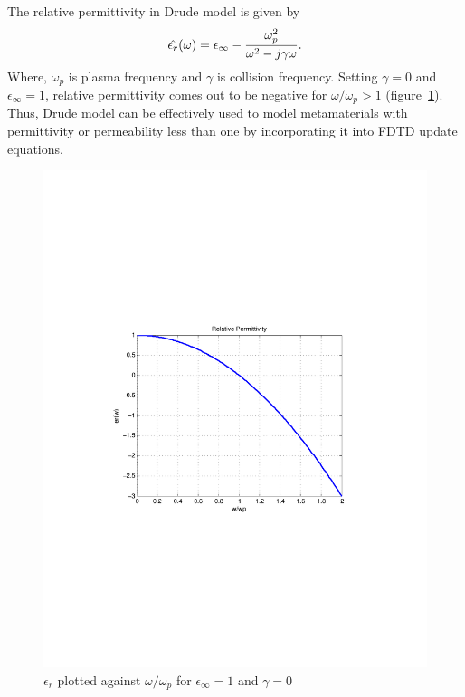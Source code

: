 \documentclass{article}
\begin{document}
The relative permittivity in Drude model is given by
\begin{equation}
\centering
\hat{\epsilon_r}(\omega)=\epsilon_\infty-\dfrac{\omega^2_p}{\omega^2-j\gamma\omega}.
\label{er-Drude}
\end{equation}
Where, $\omega_p$ is plasma frequency and $\gamma$ is collision frequency. Setting $\gamma=0$ and $\epsilon_\infty=1$, relative permittivity comes out to be negative for $\omega/\omega_p > 1$ (figure~\ref{DrudeModel_er}). Thus, Drude model can be effectively used to model metamaterials with permittivity or permeability less than one by incorporating it into FDTD update equations.
\begin{figure}[t!]
\centering
\includegraphics[scale=0.55, trim=4cm 8.5cm 4cm 8.5cm, clip]{FigCh03_DrudeModel_er.pdf}
\caption{$\epsilon_r$ plotted against $\omega/\omega_p$ for $\epsilon_\infty=1$ and $\gamma=0$}
\label{DrudeModel_er}
\end{figure}
\end{document}
